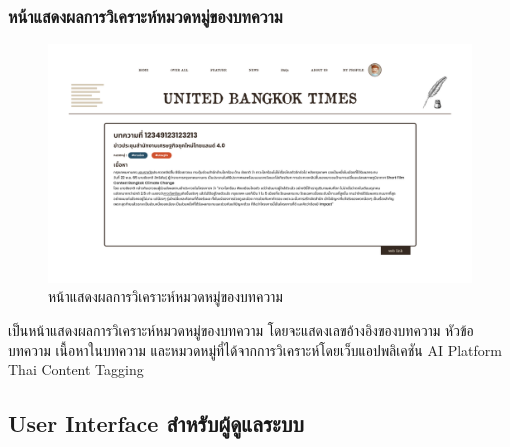 \documentclass[12pt,oneside,openright,a4paper]{cpe-thai-project}
\begin{document}
\subsubsection{หน้าแสดงผลการวิเคราะห์หมวดหมู่ของบทความ}
\begin{figure}[!ht]\centering
  \includegraphics[width=15cm]{./img/project_ui/12.png} 
  \caption{หน้าแสดงผลการวิเคราะห์หมวดหมู่ของบทความ}\label{fig:result} 
\end{figure} 
\hspace*{1cm}เป็นหน้าแสดงผลการวิเคราะห์หมวดหมู่ของบทความ โดยจะแสดงเลขอ้างอิงของบทความ หัวข้อบทความ เนื้อหาในบทความ 
และหมวดหมู่ที่ได้จากการวิเคราะห์โดยเว็บแอปพลิเคชัน AI Platform Thai Content Tagging 

\subsection{User Interface สำหรับผู้ดูแลระบบ}
\end{document}
